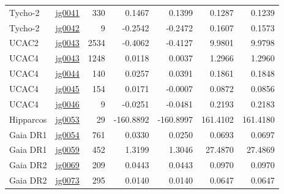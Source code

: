 {\begin{longtable}{llrrrrr}
Tycho-2 & \href{https://www.sai.msu.ru/neb/nss/html/obspos/OBS_COLL/J/jg0041.html}{jg0041} & 330 & 0.1467 & 0.1399 & 0.1287 & 0.1239 \\
Tycho-2 & \href{https://www.sai.msu.ru/neb/nss/html/obspos/OBS_COLL/J/jg0042.html}{jg0042} & 9 & -0.2542 & -0.2472 & 0.1607 & 0.1573 \\
UCAC2 & \href{https://www.sai.msu.ru/neb/nss/html/obspos/OBS_COLL/J/jg0043.html}{jg0043} & 2534 & -0.4062 & -0.4127 & 9.9801 & 9.9798 \\
UCAC4 & \href{https://www.sai.msu.ru/neb/nss/html/obspos/OBS_COLL/J/jg0043.html}{jg0043} & 1248 & 0.0118 & 0.0037 & 1.2966 & 1.2960 \\
UCAC4 & \href{https://www.sai.msu.ru/neb/nss/html/obspos/OBS_COLL/J/jg0044.html}{jg0044} & 140 & 0.0257 & 0.0391 & 0.1861 & 0.1848 \\
UCAC4 & \href{https://www.sai.msu.ru/neb/nss/html/obspos/OBS_COLL/J/jg0045.html}{jg0045} & 154 & 0.0171 & -0.0007 & 0.0872 & 0.0856 \\
UCAC4 & \href{https://www.sai.msu.ru/neb/nss/html/obspos/OBS_COLL/J/jg0046.html}{jg0046} & 9 & -0.0251 & -0.0481 & 0.2193 & 0.2183 \\
Hipparcos & \href{https://www.sai.msu.ru/neb/nss/html/obspos/OBS_COLL/J/jg0053.html}{jg0053} & 29 & -160.8892 & -160.8997 & 161.4102 & 161.4180 \\
Gaia DR1 & \href{https://www.sai.msu.ru/neb/nss/html/obspos/OBS_COLL/J/jg0054.html}{jg0054} & 761 & 0.0330 & 0.0250 & 0.0693 & 0.0697 \\
Gaia DR1 & \href{https://www.sai.msu.ru/neb/nss/html/obspos/OBS_COLL/J/jg0059.html}{jg0059} & 452 & 1.3199 & 1.3046 & 27.4870 & 27.4869 \\
Gaia DR2 & \href{https://www.sai.msu.ru/neb/nss/html/obspos/OBS_COLL/J/jg0069.html}{jg0069} & 209 & 0.0443 & 0.0443 & 0.0970 & 0.0970 \\
Gaia DR2 & \href{https://www.sai.msu.ru/neb/nss/html/obspos/OBS_COLL/J/jg0073.html}{jg0073} & 295 & 0.0140 & 0.0140 & 0.0647 & 0.0647 \\
\end{longtable}

}
